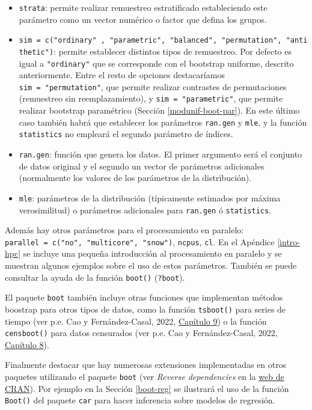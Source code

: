 \documentclass[
  10pt,
]{book}
\theoremstyle{break}
\theoremstyle{nonumberplain}
\begin{document}
\begin{itemize}
\item
  \texttt{strata}: permite realizar remuestreo estratificado estableciendo este parámetro
  como un vector numérico o factor que defina los grupos.
\item
  \texttt{sim\ =\ c("ordinary"\ ,\ "parametric",\ "balanced",\ "permutation",\ "antithetic")}:
  permite establecer distintos tipos de remuestreo.
  Por defecto es igual a \texttt{"ordinary"} que se corresponde con el bootstrap uniforme,
  descrito anteriormente. Entre el resto de opciones destacaríamos
  \texttt{sim\ =\ "permutation"}, que permite realizar contrastes de
  permutaciones (remuestreo sin reemplazamiento), y \texttt{sim\ =\ "parametric"},
  que permite realizar bootstrap paramétrico (Sección \ref{modunif-boot-par}).
  En este último caso también habrá que establecer los parámetros \texttt{ran.gen} y
  \texttt{mle}, y la función \texttt{statistics} no empleará el segundo parámetro de índices.
\item
  \texttt{ran.gen}: función que genera los datos. El primer argumento será el conjunto de datos
  original y el segundo un vector de parámetros adicionales
  (normalmente los valores de los parámetros de la distribución).
\item
  \texttt{mle}: parámetros de la distribución (típicamente estimados por máxima verosimilitud)
  o parámetros adicionales para \texttt{ran.gen} ó \texttt{statistics}.
\end{itemize}

Además hay otros parámetros para el procesamiento en paralelo: \texttt{parallel\ =\ c("no",\ "multicore",\ "snow")}, \texttt{ncpus}, \texttt{cl}.
En el Apéndice \ref{intro-hpc} se incluye una pequeña introducción al procesamiento en paralelo y se muestran algunos ejemplos sobre el uso de estos parámetros.
También se puede consultar la ayuda de la función \texttt{boot()} (\texttt{?boot}).

El paquete \texttt{boot} también incluye otras funciones que implementan métodos boostrap para otros tipos de datos, como la función \texttt{tsboot()} para series de tiempo (ver p.e. Cao y Fernández-Casal, 2022, \href{https://rubenfcasal.github.io/book_remuestreo/bootdep.html}{Capítulo 9}) o la función \texttt{censboot()} para datos censurados (ver p.e. Cao y Fernández-Casal, 2022, \href{https://rubenfcasal.github.io/book_remuestreo/bootcen.html}{Capítulo 8}).

Finalmente destacar que hay numerosas extensiones implementadas en otros paquetes utilizando el paquete \texttt{boot} (ver \emph{Reverse dependencies} en la \href{https://cran.r-project.org/package=boot}{web de CRAN}).
Por ejemplo en la Sección \ref{boot-reg} se ilustrará el uso de la función \texttt{Boot()} del paquete \texttt{car} para hacer inferencia sobre modelos de regresión.
\end{document}
